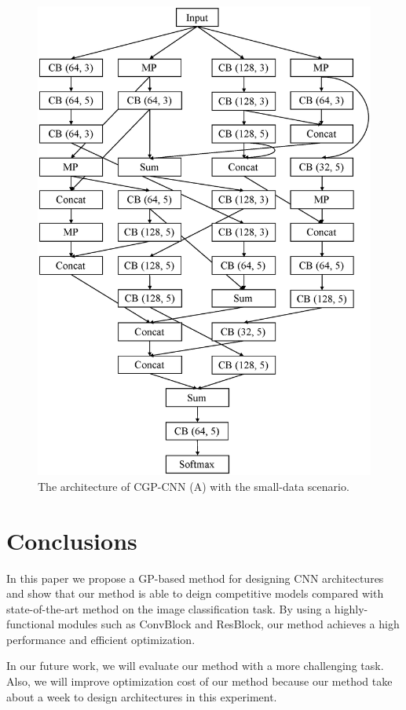 \begin{figure}[t]
\includegraphics[scale=0.35]{images/model_small.eps}
\caption{The architecture of CGP-CNN (A) with the small-data scenario.}
\label{model_small}
\end{figure}


\section{Conclusions}
In this paper we propose a GP-based method for designing CNN architectures and show that our method is able to deign competitive models compared with state-of-the-art method on the image classification task. 
By using a highly-functional modules such as ConvBlock and ResBlock, our method achieves a high performance and efficient optimization.

In our future work, we will evaluate our method with a more challenging task.
Also, we will improve optimization cost of our method because our method take about a week to design architectures in this experiment.
